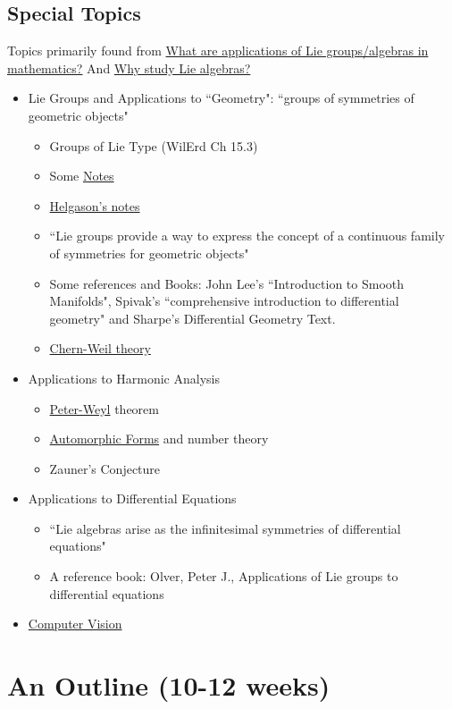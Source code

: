 \documentclass[12pt]{amsart}
\begin{document}
\subsection*{Special Topics}
Topics primarily found from 
\href{https://math.stackexchange.com/questions/1322206/what-are-applications-of-lie-groups-algebras-in-mathematics}{What are applications of Lie groups/algebras in mathematics?} 
And \href{https://mathoverflow.net/questions/58696/why-study-lie-algebras?_gl=1*1ggsex7*_ga*ODQwNjU2OTkxLjE2ODk5NjEzNDc.*_ga_S812YQPLT2*MTcxNzgzOTc5OC4xNy4xLjE3MTc4NDAwMzQuMC4wLjA.}{Why study Lie algebras?}
\begin{itemize}
    \item Lie Groups and Applications to ``Geometry": ``groups of symmetries of geometric objects"
    \begin{itemize}
        \item Groups of Lie Type (WilErd Ch 15.3)
        \item Some \href{http://www.math.sunysb.edu/~kirillov/mat552/liegroups.pdf}{Notes}
        \item \href{http://ocw.mit.edu/courses/mathematics/18-755-introduction-to-lie-groups-fall-2004/}{Helgason's notes}
        \item ``Lie groups provide a way to express the concept of a continuous family of symmetries for geometric objects"
        \item Some references and Books: John Lee's ``Introduction to Smooth Manifolds", Spivak's ``comprehensive introduction to differential geometry" and Sharpe's Differential Geometry Text.
        \item \href{https://en.wikipedia.org/wiki/Chern%E2%80%93Weil_homomorphism}{Chern-Weil theory}
    \end{itemize}
    \item Applications to Harmonic Analysis
    \begin{itemize}
        \item \href{https://en.wikipedia.org/wiki/Peter%E2%80%93Weyl_theorem}{Peter-Weyl} theorem
        \item \href{https://en.wikipedia.org/wiki/Automorphic_form}{Automorphic Forms} and number theory
        \item Zauner's Conjecture
    \end{itemize}
    \item Applications to Differential Equations
    \begin{itemize}
        \item ``Lie algebras arise as the infinitesimal symmetries of differential equations"
        \item A reference book: Olver, Peter J., Applications of Lie groups to differential equations
    \end{itemize}
    \item \href{https://web.archive.org/web/20160909004917/http://www.technicoder.com/blog/Lie_Group_in_Computer_Vision.html}{Computer Vision}
\end{itemize}

\section*{An Outline (10-12 weeks)}
\end{document}
